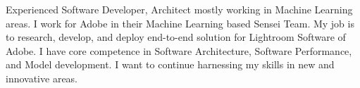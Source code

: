 \par{
Experienced Software Developer, Architect mostly working in Machine Learning areas. I work for Adobe in their Machine Learning based Sensei Team. My job is to research, develop, and deploy end-to-end solution for Lightroom Software of Adobe. I have core competence in Software Architecture, Software Performance, and Model development. I want to continue harnessing my skills in new and innovative areas.
}